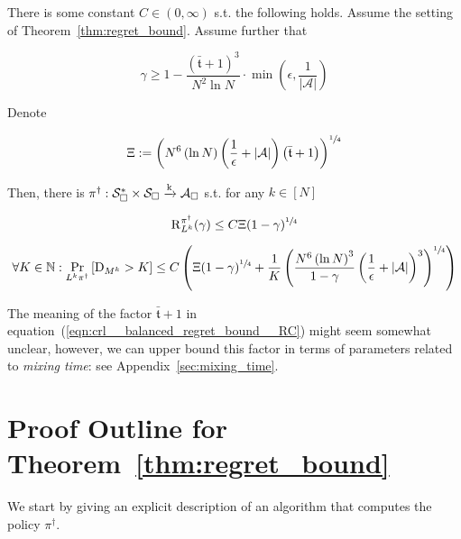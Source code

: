 \documentclass[anon,12pt]{colt2018} %
\newcommand{\AP}[1]{\left(#1\right)}
\newcommand{\AB}[1]{\left[#1\right]}
\newcommand{\Pa}[2]{\underset{#1}{\operatorname{Pr}}\AB{#2}}
\newcommand{\Nats}{\mathbb{N}}
\newcommand{\Abs}[1]{\left\vert #1 \right\vert}
\newcommand{\K}{\xrightarrow{\textnormal{k}}}
\newcommand{\A}{\mathcal{A}}
\newcommand{\St}{\mathcal{S}}
\newcommand{\Rg}{\operatorname{R}}
\newcommand{\MP}[2]{#1#2}
\newcommand{\Tn}{\mathfrak{t}}
\newcommand{\ND}{\operatorname{D}}
\newcommand{\RC}{\Xi}
\begin{document}
\begin{samepage}
\begin{corollary}
\label{crl:balanced_regret_bound}

There is some constant $C \in (0,\infty)$ s.t. the following holds. Assume the setting of Theorem~\ref{thm:regret_bound}. Assume further that 

\begin{equation}
\gamma \geq 1 - \frac{\AP{\bar{\Tn}+1}^3}{N^2 \ln{N}}\cdot\min\AP{\epsilon,\frac{1}{\Abs{\A}}}
\end{equation}

Denote

\begin{equation}
\label{eqn:crl__balanced_regret_bound__RC}
\RC:=\AP{N^6 \AP{\ln N} \AP{\frac{1}{\epsilon}+\Abs{\A}}\AP{\bar{\Tn}+1}}^{\sfrac{1}{4}}
\end{equation}

Then, there is $\pi^\dagger: \St_\square^* \times \St_\square \K \A_\square$ s.t. for any $k\in[N]$

\begin{equation}
\label{eqn:crl__balanced_regret_bound__regret}
\Rg_{L^k}^{\pi^\dagger}(\gamma) \leq C\RC(1-\gamma)^{\sfrac{1}{4}}%
\end{equation}

\begin{equation}
\label{eqn:crl__balanced_regret_bound__delegations}
\forall K \in \Nats: \Pa{\MP{L^k}{\pi^\dagger}}{\ND_{M^k} > K} \leq C\AP{\Xi(1-\gamma)^{\sfrac{1}{4}}+\frac{1}{K}\AP{\frac{N^6\AP{\ln{N}}^3}{1-\gamma}\AP{\frac{1}{\epsilon}+\Abs{\A}}^3}^{\sfrac{1}{4}}}
\end{equation}

\end{corollary}
\end{samepage}

The meaning of the factor $\bar{\Tn}+1$ in equation~(\ref{eqn:crl__balanced_regret_bound__RC}) might seem somewhat unclear, however, we can upper bound this factor in terms of parameters related to \emph{mixing time}: see Appendix~\ref{sec:mixing_time}. 

\section{Proof Outline for Theorem~\ref{thm:regret_bound}}

We start by giving an explicit description of an algorithm that computes the policy $\pi^\dagger$.
\end{document}
